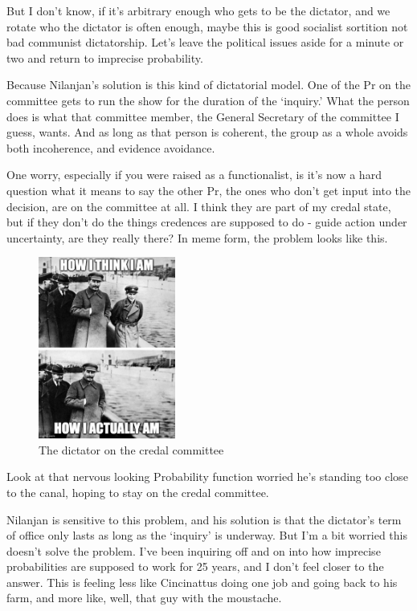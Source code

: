 \documentclass[
  12pt,
]{article}
\begin{document}
But I don't know, if it's arbitrary enough who gets to be the dictator,
and we rotate who the dictator is often enough, maybe this is good
socialist sortition not bad communist dictatorship. Let's leave the
political issues aside for a minute or two and return to imprecise
probability.

Because Nilanjan's solution is this kind of dictatorial model. One of
the Pr on the committee gets to run the show for the duration of the
`inquiry.' What the person does is what that committee member, the
General Secretary of the committee I guess, wants. And as long as that
person is coherent, the group as a whole avoids both incoherence, and
evidence avoidance.

One worry, especially if you were raised as a functionalist, is it's now
a hard question what it means to say the other Pr, the ones who don't
get input into the decision, are on the committee at all. I think they
are part of my credal state, but if they don't do the things credences
are supposed to do - guide action under uncertainty, are they really
there? In meme form, the problem looks like this.

\begin{figure}
\centering
\includegraphics[width=0.4\textwidth,height=\textheight]{missing.jpg}
\caption{The dictator on the credal committee}
\end{figure}

Look at that nervous looking Probability function worried he's standing
too close to the canal, hoping to stay on the credal committee.

Nilanjan is sensitive to this problem, and his solution is that the
dictator's term of office only lasts as long as the `inquiry' is
underway. But I'm a bit worried this doesn't solve the problem. I've
been inquiring off and on into how imprecise probabilities are supposed
to work for 25 years, and I don't feel closer to the answer. This is
feeling less like Cincinattus doing one job and going back to his farm,
and more like, well, that guy with the moustache.
\end{document}
